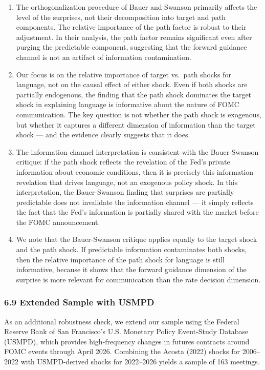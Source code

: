 \documentclass[
]{article}
\begin{document}
\begin{enumerate}
\def\labelenumi{\arabic{enumi}.}
\item
  The orthogonalization procedure of Bauer and Swanson primarily affects
  the level of the surprises, not their decomposition into target and
  path components. The relative importance of the path factor is robust
  to their adjustment. In their analysis, the path factor remains
  significant even after purging the predictable component, suggesting
  that the forward guidance channel is not an artifact of information
  contamination.
\item
  Our focus is on the relative importance of target vs.~path shocks for
  language, not on the causal effect of either shock. Even if both
  shocks are partially endogenous, the finding that the path shock
  dominates the target shock in explaining language is informative about
  the nature of FOMC communication. The key question is not whether the
  path shock is exogenous, but whether it captures a different dimension
  of information than the target shock --- and the evidence clearly
  suggests that it does.
\item
  The information channel interpretation is consistent with the
  Bauer-Swanson critique: if the path shock reflects the revelation of
  the Fed's private information about economic conditions, then it is
  precisely this information revelation that drives language, not an
  exogenous policy shock. In this interpretation, the Bauer-Swanson
  finding that surprises are partially predictable does not invalidate
  the information channel --- it simply reflects the fact that the Fed's
  information is partially shared with the market before the FOMC
  announcement.
\item
  We note that the Bauer-Swanson critique applies equally to the target
  shock and the path shock. If predictable information contaminates both
  shocks, then the relative importance of the path shock for language is
  still informative, because it shows that the forward guidance
  dimension of the surprise is more relevant for communication than the
  rate decision dimension.
\end{enumerate}

\subsubsection{6.9 Extended Sample with
USMPD}\label{extended-sample-with-usmpd}

As an additional robustness check, we extend our sample using the
Federal Reserve Bank of San Francisco's U.S. Monetary Policy Event-Study
Database (USMPD), which provides high-frequency changes in futures
contracts around FOMC events through April 2026. Combining the Acosta
(2022) shocks for 2006--2022 with USMPD-derived shocks for 2022--2026
yields a sample of 163 meetings.
\end{document}
